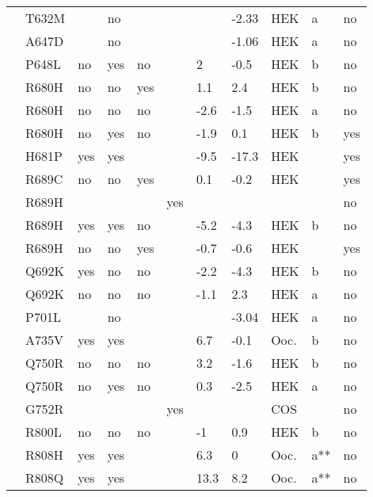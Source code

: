 \begin{tiny}
\begin{longtable}{p{4cm}|l|llll|ll|lll}
\citet{Hoshi2014MutationDB} & T632M &  & no &  &  &  & -2.33 & HEK & a & no \\
\citet{Hoshi2014MutationDB} & A647D &  & no &  &  &  & -1.06 & HEK & a & no \\
\citet{Beyder2014MutationDB} & P648L & no & yes & no &  & 2 & -0.5 & HEK & b & no \\
\citet{Cheng2011MutationDB} & R680H & no & no & yes &  & 1.1 & 2.4 & HEK & b & no \\
\citet{Cheng2011MutationDB} & R680H & no & no & no &  & -2.6 & -1.5 & HEK & a & no \\
\citet{Wang2007aMutationDB} & R680H & no & yes & no &  & -1.9 & 0.1 & HEK & b & yes \\
\citet{Mok2003MutationDB} & H681P & yes & yes &  &  & -9.5 & -17.3 & HEK &  & yes \\
\citet{Sottas2013MutationDB} & R689C & no & no & yes &  & 0.1 & -0.2 & HEK &  & yes \\
\citet{Hong2012MutationDB} & R689H &  &  &  & yes &  &  &  &  & no \\
\citet{Kapplinger2015MutationDB} & R689H & yes & yes & no &  & -5.2 & -4.3 & HEK & b & no \\
\citet{Sottas2013MutationDB} & R689H & no & no & yes &  & -0.7 & -0.6 & HEK &  & yes \\
\citet{Kapplinger2015MutationDB} & Q692K & yes & no & no &  & -2.2 & -4.3 & HEK & b & no \\
\citet{Kapplinger2015MutationDB} & Q692K & no & no & no &  & -1.1 & 2.3 & HEK & a & no \\
\citet{Hoshi2014MutationDB} & P701L &  & no &  &  &  & -3.04 & HEK & a & no \\
\citet{Vatta2002bMutationDB} & A735V & yes & yes &  &  & 6.7 & -0.1 & Ooc. & b & no \\
\citet{Kapplinger2015MutationDB} & Q750R & no & no & no &  & 3.2 & -1.6 & HEK & b & no \\
\citet{Kapplinger2015MutationDB} & Q750R & no & yes & no &  & 0.3 & -2.5 & HEK & a & no \\
\citet{Potet2003MutationDB} & G752R &  &  &  & yes &  &  & COS &  & no \\
\citet{Kapplinger2015MutationDB} & R800L & no & no & no &  & -1 & 0.9 & HEK & b & no \\
\citet{Chen1996MutationDB} & R808H & yes & yes &  &  & 6.3 & 0 & Ooc. & a** & no \\
\citet{Chen1996MutationDB} & R808Q & yes & yes &  &  & 13.3 & 8.2 & Ooc. & a** & no \\

\end{longtable}
\end{tiny}
